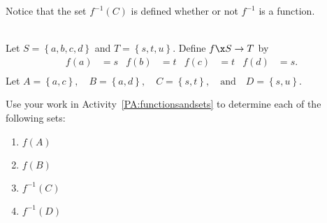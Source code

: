 \noindent
Notice that the set $f^{-1} ( C )$ is defined whether or not  $f^{-1}$ is a function.

\begin{prog} \label{prog:functionsandsets} 
\hfill \\
Let $S = \left\{ a, b, c, d \right\}$ and $T = \left\{ s, t, u \right\}$.  Define $f\x S \to T$ by
\begin{align*}
f(a) &= s &  f(b) &= t &  f(c) &= t &  f(d) &= s.  \\
\end{align*}
\noindent
Let \quad $A = \left\{ a, c \right\}, \quad B = \left\{ a, d \right\},  \quad C = \left\{ s, t \right\},  
\quad \text{and} \quad D = \left\{ s, u \right\}$.

\noindent
Use your work in \typeu Activity~\ref*{PA:functionsandsets} to determine each of the following sets:

\begin{multicols}{4}
\begin{enumerate}
\item $f ( A )$
\item $f ( B )$
\item $f^{-1} ( C )$
\item $f^{-1} ( D )$
\end{enumerate}
\end{multicols}
\end{prog}
\hbreak

